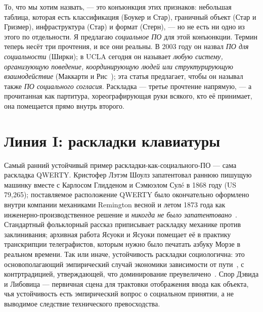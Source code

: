\documentclass[10pt,letterpaper,twocolumn]{article}
\begin{document}
То, что мы хотим назвать, --- это конъюнкция этих признаков: небольшая таблица, которая есть классификация (Боукер и Стар), граничный объект (Стар и Гризмер), инфраструктура (Стар) и формат (Стерн), --- но не есть ни одно из этого по отдельности. Я предлагаю \emph{социальное ПО} для этой конъюнкции. Термин теперь несёт три прочтения, и все они реальны. В 2003 году он назвал \emph{ПО для социальности} (Ширки); в UCLA сегодня он называет \emph{любую систему, организующую поведение, координирующую людей или структурирующую взаимодействие} (Маккарти и Рис~\citep{sosoft_info}); эта статья предлагает, чтобы он называл также \emph{ПО социального согласия}. Раскладка --- третье прочтение напрямую, --- а прочитанная как партитура, хореографирующая руки всякого, кто её принимает, она помещается прямо внутрь второго.

\section{Линия I: раскладки клавиатуры}
\label{sec:lineage1}

Самый ранний устойчивый пример раскладки-как-социального-ПО --- сама раскладка QWERTY. Кристофер Лэтэм Шоулз запатентовал раннюю пишущую машинку вместе с Карлосом Глидденом и Сэмюэлом Сулé в 1868 году (US 79{,}265); поставляемое расположение QWERTY было окончательно оформлено внутри компании механиками Remington весной и летом 1873 года как инженерно-производственное решение и \emph{никогда не было запатентовано}~\citep{yasuoka2011prehistory}. Стандартный фольклорный рассказ приписывает раскладку механике против заклинивания; архивная работа Ясуоки и Ясуоки помещает её в практику транскрипции телеграфистов, которым нужно было печатать азбуку Морзе в реальном времени. Так или иначе, устойчивость раскладки социологична: это основополагающий эмпирический случай экономики зависимости от пути~\citep{david1985qwerty,arthur1989competing}, с контртрадицией, утверждающей, что доминирование преувеличено~\citep{liebowitz1990fable}. Спор Дэвида и Либовица --- первичная сцена для трактовки отображения ввода как объекта, чья устойчивость есть эмпирический вопрос о социальном принятии, а не выводимое следствие технического превосходства.
\end{document}
